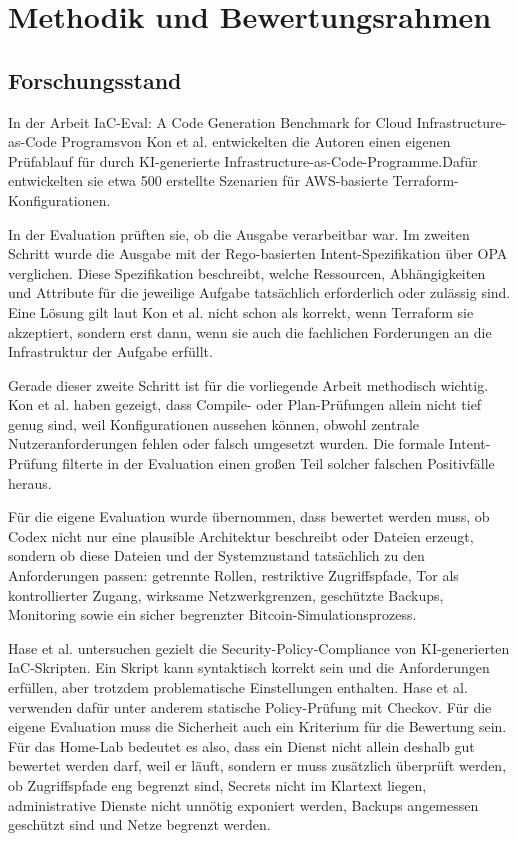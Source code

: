 
\section{Methodik und Bewertungsrahmen}

\subsection{Forschungsstand}

In der Arbeit \glqq IaC-Eval: A Code Generation Benchmark for Cloud Infrastructure-as-Code Programs\grqq von Kon et al. entwickelten die Autoren einen eigenen Prüfablauf für durch \acs{KI}-generierte Infrastructure-as-Code-Programme.Dafür entwickelten sie etwa 500 erstellte Szenarien für AWS-basierte Terraform-Konfigurationen.

In der Evaluation prüften sie, ob die Ausgabe verarbeitbar war. Im zweiten Schritt wurde die Ausgabe mit der Rego-basierten Intent-Spezifikation über \acf{OPA} verglichen. Diese Spezifikation beschreibt, welche Ressourcen, Abhängigkeiten und Attribute für die jeweilige Aufgabe tatsächlich erforderlich oder zulässig sind. Eine Lösung gilt laut Kon et al. nicht schon als korrekt, wenn Terraform sie akzeptiert, sondern erst dann, wenn sie auch die fachlichen Forderungen an die Infrastruktur der Aufgabe erfüllt.\cite{kon2024iaceval}

Gerade dieser zweite Schritt ist für die vorliegende Arbeit methodisch wichtig. Kon et al. haben gezeigt, dass Compile- oder Plan-Prüfungen allein nicht tief genug sind, weil Konfigurationen aussehen können, obwohl zentrale Nutzeranforderungen fehlen oder falsch umgesetzt wurden. Die formale Intent-Prüfung filterte in der Evaluation einen großen Teil solcher falschen Positivfälle heraus.

Für die eigene Evaluation wurde übernommen, dass bewertet werden muss, ob Codex nicht nur eine plausible Architektur beschreibt oder Dateien erzeugt, sondern ob diese Dateien und der Systemzustand tatsächlich zu den Anforderungen passen: getrennte Rollen, restriktive Zugriffspfade, Tor als kontrollierter Zugang, wirksame Netzwerkgrenzen, geschützte Backups, Monitoring sowie ein sicher begrenzter Bitcoin-Simulationsprozess.

Hase et al. untersuchen gezielt die Security-Policy-Compliance von \acs{KI}-generierten \acs{IaC}-Skripten. Ein Skript kann syntaktisch korrekt sein und die Anforderungen erfüllen, aber trotzdem problematische Einstellungen enthalten. Hase et al. verwenden dafür unter anderem statische Policy-Prüfung mit Checkov.\cite{hase2026securitypolicyiac} Für die eigene Evaluation muss die Sicherheit auch ein Kriterium für die Bewertung sein. Für das Home-Lab bedeutet es also, dass ein Dienst nicht allein deshalb gut bewertet werden darf, weil er läuft, sondern er muss zusätzlich überprüft werden, ob Zugriffspfade eng begrenzt sind, Secrets nicht im Klartext liegen, administrative Dienste nicht unnötig exponiert werden, Backups angemessen geschützt sind und Netze begrenzt werden.

